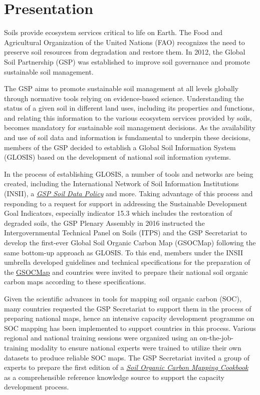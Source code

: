 \documentclass[10pt,b5paper,]{book}
\theoremstyle{definition}
\theoremstyle{definition}
\theoremstyle{definition}
\theoremstyle{remark}
\begin{document}
\mainmatter
\tableofcontents
\listoffigures
\listoftables
\printnomenclature

\hypertarget{presentation}{%
\chapter{Presentation}\label{presentation}}

Soils provide ecosystem services critical to life on Earth. The Food and
Agricultural Organization of the United Nations (FAO) recognizes the
need to preserve soil resources from degradation and restore them. In
2012, the Global Soil Partnership (GSP) was established to improve soil
governance and promote sustainable soil management.

The GSP aims to promote sustainable soil management at all levels
globally through normative tools relying on evidence-based science.
Understanding the status of a given soil in different land uses,
including its properties and functions, and relating this information to
the various ecosystem services provided by soils, becomes mandatory for
sustainable soil management decisions. As the availability and use of
soil data and information is fundamental to underpin these decisions,
members of the GSP decided to establish a Global Soil Information System
(GLOSIS) based on the development of national soil information systems.

In the process of establishing GLOSIS, a number of tools and networks
are being created, including the International Network of Soil
Information Institutions (INSII), a
\href{http://www.fao.org/3/a-bs975e.pdf}{\emph{GSP Soil Data Policy}}
\citep{gsp_data_2017} and more. Taking advantage of this process and
responding to a request for support in addressing the Sustainable
Development Goal Indicators, especially indicator 15.3 which includes
the restoration of degraded soils, the GSP Plenary Assembly in 2016
instructed the Intergovernmental Technical Panel on Soils (ITPS) and the
GSP Secretariat to develop the first-ever Global Soil Organic Carbon Map
(GSOCMap) following the same bottom-up approach as GLOSIS. To this end,
members under the INSII umbrella developed guidelines and technical
specifications for the preparation of the
\href{http://www.fao.org/3/a-bp164e.pdf}{GSOCMap} and countries were
invited to prepare their national soil organic carbon maps according to
these specifications.

Given the scientific advances in tools for mapping soil organic carbon
(SOC), many countries requested the GSP Secretariat to support them in
the process of preparing national maps, hence an intensive capacity
development programme on SOC mapping has been implemented to support
countries in this process. Various regional and national training
sessions were organized using an on-the-job-training modality to ensure
national experts were trained to utilize their own datasets to produce
reliable SOC maps. The GSP Secretariat invited a group of experts to
prepare the first edition of a
\href{http://www.fao.org/3/a-bs901e.pdf}{\emph{Soil Organic Carbon
Mapping Cookbook}} \citep{cookbook_2} as a comprehensible reference
knowledge source to support the capacity development process.
\end{document}
